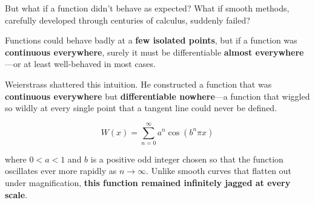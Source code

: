 But what if a function didn’t behave as expected? What if smooth methods, carefully developed through centuries of calculus, suddenly failed?

\begin{center}
\end{center}

Functions could behave badly at a \textbf{few isolated points}, but if a function was \textbf{continuous everywhere}, surely it must be differentiable \textbf{almost everywhere}—or at least well-behaved in most cases.

Weierstrass shattered this intuition. He constructed a function that was \textbf{continuous everywhere} but \textbf{differentiable nowhere}—a function that wiggled so wildly at every single point that a tangent line could never be defined.

\[
W(x) = \sum_{n=0}^{\infty} a^n \cos(b^n \pi x)
\]

where \( 0 < a < 1 \) and \( b \) is a positive odd integer chosen so that the function oscillates ever more rapidly as \( n \to \infty \). Unlike smooth curves that flatten out under magnification, \textbf{this function remained infinitely jagged at every scale}.




